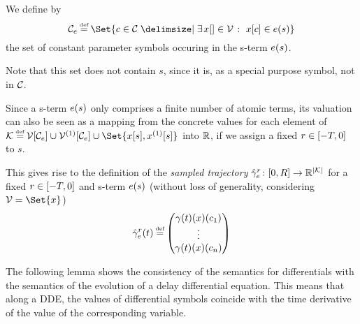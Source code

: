     \begin{definition}\label{def:termvars}
        We define by
        \begin{equation*}
            \constants[\astrm] \defeq \Set{c\in\constants \with \mexists{\x\in\allvars}\holds\x[c]\in\astrm(s)}
        \end{equation*}
        the set of constant parameter symbols occuring in the s-term $\astrm(s)$.

        Note that this set does not contain $s$, since it is, as a special purpose symbol, not in $\constants$.
    \end{definition}

    \begin{definition}\label{def:sampled-trajectory}
        Since a s-term $\astrm(s)$ only comprises a finite number of atomic terms, its valuation can also be seen as a mapping from the concrete values for each element of $\mathcal{K}\defeq \delayvars[\astrm] \cup \delaydiffvars[\astrm] \cup \Set{\x[s], \Dx[s]}$ into $\R$, if we assign a fixed $r\in\closeddelayinterval$ to $s$.


        This gives rise to the definition of the \emph{sampled trajectory} $\sampledtraj[\past]{\astrm}\from\compactum{0}{\duration}\to\R^{\abs{\mathcal{K}}}$ for a fixed $\past\in\closeddelayinterval$ and s-term $\astrm(s)$ (without loss of generality, considering $\allvars=\Set{x}$)
        \begin{equation*}
            \sampledtraj[\past]{\astrm}(t) \defeq \colvec{
                \trajectory(t)(x)(c_1)\\
                \vdots\\
                \trajectory(t)(x)(c_n)
            }
        \end{equation*}
    \end{definition}

    The following lemma shows the consistency of the semantics for differentials with the semantics of the evolution of a delay differential equation.
    This means that along a DDE, the values of differential symbols coincide with the time derivative of the value of the corresponding variable.

